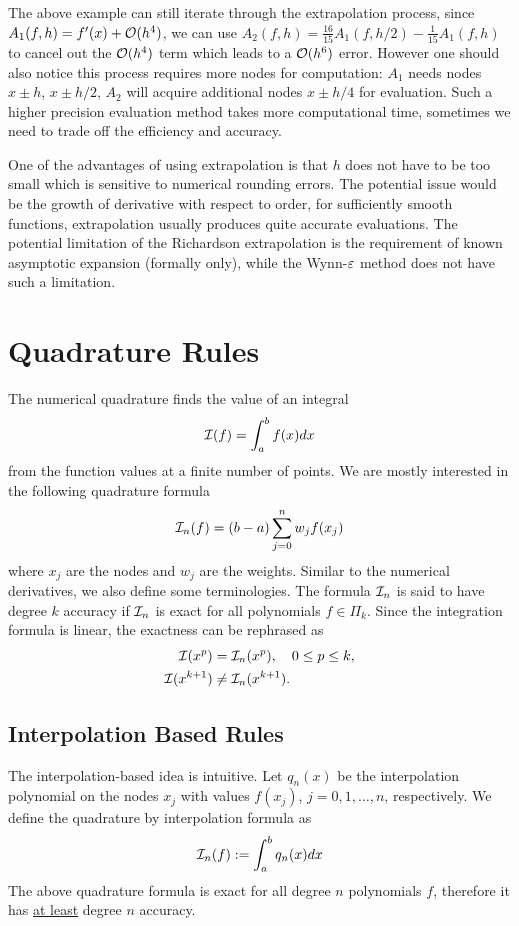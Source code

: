 The above example can still iterate through the extrapolation process, since $A_1(f, h) = f'(x) + \mathcal O(h^4)$, we can use $A_2(f, h) = \frac{16}{15}A_1(f, h/2) -  \frac{1}{15}A_1(f, h)$ to cancel out the $\mathcal O(h^4)$ term which leads to a $\mathcal O(h^6)$ error. However one should also notice this process requires more nodes for computation: $A_1$ needs nodes $x\pm h$, $x\pm h/2$, $A_2$ will acquire additional nodes $x\pm h/4$ for evaluation. Such a higher precision evaluation method takes more computational time, sometimes we need to trade off the efficiency and accuracy.

\begin{remark}
    One of the advantages of using extrapolation is that $h$ does not have to be too small which is sensitive to numerical rounding errors. The potential issue would be the growth of derivative with respect to order, for sufficiently smooth functions, extrapolation usually produces quite accurate evaluations. The potential limitation of the Richardson extrapolation is the requirement of known asymptotic expansion (formally only), while the Wynn-$\varepsilon$ method does not have such a limitation. 
\end{remark}


\section{Quadrature Rules}
\label{Sec: 3-Qua-Rul}
The numerical quadrature finds the value of an integral 
$$\mathcal I(f) = \int_a^b f(x) dx $$
from the function values at a finite number of points. We are mostly interested in the following quadrature formula 
\begin{equation}
    \mathcal I_n(f) = (b - a) \sum_{j=0}^n w_j f(x_j)
\end{equation}
where $x_j$ are the nodes and $w_j$ are the weights. Similar to the numerical derivatives, we also define some terminologies. The formula $\mathcal I_n$ is said to have degree $k$ accuracy if $\mathcal I_n$ is exact for all polynomials $f\in\Pi_k$. Since the integration formula is linear, the exactness can be rephrased as 
\begin{equation}
    \begin{aligned}
        \mathcal I(x^p) &= \mathcal I_n(x^p),\quad 0\le p \le k, \\
        \mathcal I(x^{k+1}) &\neq \mathcal I_n(x^{k+1}) .   
    \end{aligned}
\end{equation}
\subsection{Interpolation Based Rules}
The interpolation-based idea is intuitive. Let $q_n(x)$ be the interpolation polynomial on the nodes $x_j$ with values $f(x_j)$, $j=0,1,\dots, n$, respectively. We define the quadrature by interpolation formula as 
\begin{equation}
    \mathcal I_n(f):= \int_a^b q_n(x) dx 
\end{equation}
The above quadrature formula is exact for all degree $n$ polynomials $f$, therefore it has \underline{at least} degree $n$ accuracy. 

